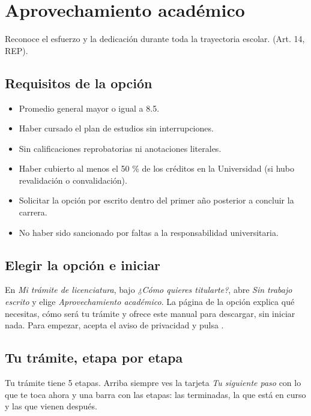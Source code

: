 \section{Aprovechamiento académico}
Reconoce el esfuerzo y la dedicación durante toda la trayectoria escolar. (Art. 14, REP).

\subsection{Requisitos de la opción}
\begin{itemize}
  \item Promedio general mayor o igual a 8.5.
  \item Haber cursado el plan de estudios sin interrupciones.
  \item Sin calificaciones reprobatorias ni anotaciones literales.
  \item Haber cubierto al menos el 50 \% de los créditos en la Universidad (si hubo revalidación o convalidación).
  \item Solicitar la opción por escrito dentro del primer año posterior a concluir la carrera.
  \item No haber sido sancionado por faltas a la responsabilidad universitaria.
\end{itemize}
\subsection{Elegir la opción e iniciar}
En \emph{Mi trámite de licenciatura}, bajo \emph{¿Cómo quieres titularte?}, abre \emph{Sin trabajo escrito} y elige \emph{Aprovechamiento académico}. La página de la opción explica qué necesitas, cómo será tu trámite y ofrece este manual para descargar, sin iniciar nada. Para empezar, acepta el aviso de privacidad y pulsa .
\subsection{Tu trámite, etapa por etapa}
Tu trámite tiene 5 etapas. Arriba siempre ves la tarjeta \emph{Tu siguiente paso} con lo que te toca ahora y una barra con las etapas: las terminadas, la que está en curso y las que vienen después.
